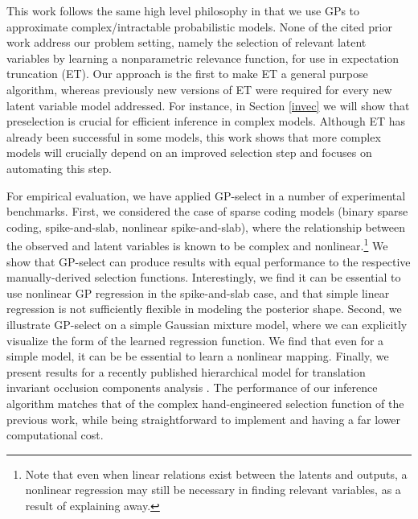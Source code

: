 This work follows the same high level philosophy in that we use GPs to approximate complex/intractable probabilistic models. None of the cited prior work address our problem setting, namely the selection of relevant latent variables by learning a nonparametric relevance function, for use in expectation truncation (ET). %
%
Our approach is the first to make ET a general purpose algorithm, whereas previously new versions of ET were required for every new latent variable model addressed. For instance, in Section \ref{invec} we will show that preselection is crucial for efficient inference in complex models. 
Although ET has already been successful in some models, this work shows that more complex models will crucially depend on an improved selection step and focuses on automating this step.

For empirical evaluation, 
we have applied GP-select in a number of experimental benchmarks.
First, we considered the case of sparse coding models (binary sparse coding,
spike-and-slab, nonlinear spike-and-slab), where the relationship between the
observed and latent variables is known to be complex and nonlinear.\footnote{Note that
 even when linear relations exist between the latents and outputs, a nonlinear
regression may still be necessary in finding relevant variables,
as a result of explaining away.}
%
We show that GP-select can produce results with equal performance to the respective manually-derived selection functions.
%
Interestingly, we find it can be essential to use nonlinear GP regression
in the spike-and-slab case, and that simple linear regression is not
sufficiently flexible in modeling the posterior shape.
%
Second, we illustrate GP-select on a simple Gaussian mixture model,
where we can explicitly visualize the form of the learned regression function.
We find that even for a simple model, it can be be essential to learn a nonlinear mapping.
%
Finally, we present results
for a recently published hierarchical model for  translation invariant occlusion components analysis
\citep{DaiLucke2014}.
The performance of our inference algorithm matches that of the complex
hand-engineered selection function of the previous work, while being straightforward
to implement and having a far lower computational cost.

